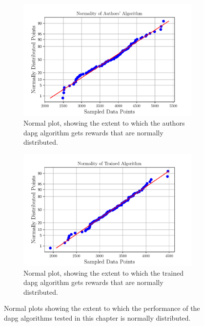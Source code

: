 \begin{figure}[!h]
	\centering
	\begin{subfigure}[b]{0.48\textwidth}
		\centering
		\includegraphics[width=\textwidth]{chapters/3-in-hand-manipulation/fig/sampled-data-points-vs-normally-distributed-points-authors.pdf}
		\caption{Normal plot, showing the extent to which the authors \gls{dapg} algorithm gets rewards that are normally distributed. }
		\label{fig:sampled-data-points-vs-normally-distributed-points-authors}
	\end{subfigure}
	\hfill
	\begin{subfigure}[b]{0.48\textwidth}
		\centering
		\includegraphics[width=\textwidth]{chapters/3-in-hand-manipulation/fig/sampled-data-points-vs-normally-distributed-points-trained.pdf}
		\caption{Normal plot, showing the extent to which the trained \gls{dapg} algorithm gets rewards that are normally distributed.}
		\label{fig:sampled-data-points-vs-normally-distributed-points-trained}
	\end{subfigure}
	\caption{Normal plots showing the extent to which the performance of the \gls{dapg} algorithms tested in this chapter is normally distributed.}
	\label{fig:sampled-data-points-vs-normally-distributed-points-trained-authors}
\end{figure}

